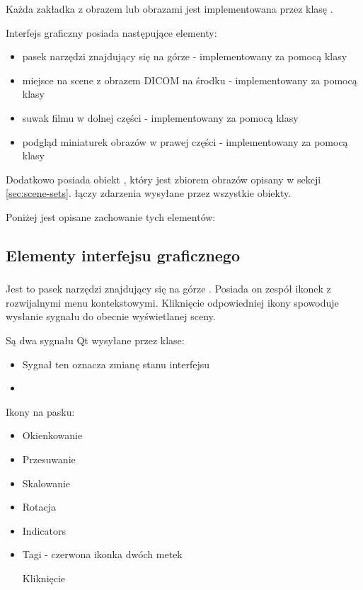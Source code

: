
Każda zakładka z obrazem lub obrazami jest implementowana przez klasę .

Interfejs graficzny  posiada następujące elementy:
\begin{itemize}
    \item pasek narzędzi znajdujący się na górze - implementowany za pomocą klasy 
    \item miejsce na scene z obrazem DICOM na środku - implementowany za pomocą klasy 
    \item suwak filmu w dolnej części - implementowany za pomocą klasy 
    \item podgląd miniaturek obrazów w prawej części - implementowany za pomocą klasy 
\end{itemize}

Dodatkowo posiada obiekt , który jest zbiorem obrazów opisany w sekcji \ref{sec:scene-sets}.
 łączy zdarzenia wysyłane przez wszystkie obiekty.

Poniżej jest opisane zachowanie tych elementów:

\subsection{Elementy interfejsu graficznego}

\subsubsection{}

Jest to pasek narzędzi znajdujący się na górze .
Posiada on zespół ikonek z rozwijalnymi menu kontekstowymi.
Kliknięcie odpowiedniej ikony spowoduje wysłanie sygnału do obecnie wyświetlanej sceny.

Są dwa sygnału Qt wysyłane przez klase:
\begin{itemize}
    \item {}

    Sygnał ten oznacza zmianę stanu interfejsu

    \item {}
\end{itemize}


Ikony na pasku:
\begin{itemize}
    \item Okienkowanie
    \item Przesuwanie
    \item Skalowanie
    \item Rotacja
    \item Indicators
    \item Tagi - czerwona ikonka dwóch metek

    Kliknięcie 
\end{itemize}

